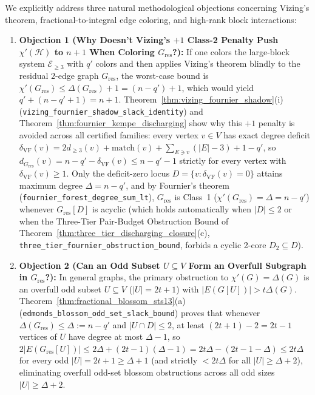 \documentclass[11pt,reqno]{amsart}
\theoremstyle{definition}
\theoremstyle{remark}
\begin{document}
We explicitly address three natural methodological objections concerning Vizing's theorem, fractional-to-integral edge coloring, and high-rank block interactions:
\begin{enumerate}
  \item \textbf{Objection 1 (Why Doesn't Vizing's $+1$ Class-2 Penalty Push $\chi'(\mathcal{H})$ to $n + 1$ When Coloring $G_{\mathrm{res}}$?):} If one colors the large-block system $\mathcal{E}_{\ge 3}$ with $q'$ colors and then applies Vizing's theorem blindly to the residual $2$-edge graph $G_{\mathrm{res}}$, the worst-case bound is $\chi'(G_{\mathrm{res}}) \le \Delta(G_{\mathrm{res}}) + 1 = (n - q') + 1$, which would yield $q' + (n - q' + 1) = n + 1$. Theorem~\ref{thm:vizing_fournier_shadow}(i) (\texttt{vizing\_fournier\_shadow\_slack\_identity}) and Theorem~\ref{thm:fournier_kempe_discharging} show why this $+1$ penalty is avoided across all certified families: every vertex $v \in V$ has exact degree deficit $\delta_{\mathrm{VF}}(v) = 2 d_{\ge 3}(v) + \mathrm{match}(v) + \sum_{E \ni v}(|E| - 3) + 1 - q'$, so $d_{G_{\mathrm{res}}}(v) = n - q' - \delta_{\mathrm{VF}}(v) \le n - q' - 1$ strictly for every vertex with $\delta_{\mathrm{VF}}(v) \ge 1$. Only the deficit-zero locus $D = \{v : \delta_{\mathrm{VF}}(v) = 0\}$ attains maximum degree $\Delta = n - q'$, and by Fournier's theorem (\texttt{fournier\_forest\_degree\_sum\_lt}), $G_{\mathrm{res}}$ is Class~1 ($\chi'(G_{\mathrm{res}}) = \Delta = n - q'$) whenever $G_{\mathrm{res}}[D]$ is acyclic (which holds automatically when $|D| \le 2$ or when the Three-Tier Pair-Budget Obstruction Bound of Theorem~\ref{thm:three_tier_discharging_closure}(c), \texttt{three\_tier\_fournier\_obstruction\_bound}, forbids a cyclic 2-core $D_2 \subseteq D$).
  \item \textbf{Objection 2 (Can an Odd Subset $U \subseteq V$ Form an Overfull Subgraph in $G_{\mathrm{res}}$?):} In general graphs, the primary obstruction to $\chi'(G) = \Delta(G)$ is an overfull odd subset $U \subseteq V$ ($|U| = 2t + 1$) with $|E(G[U])| > t\Delta(G)$. Theorem~\ref{thm:fractional_blossom_sts13}(a) (\texttt{edmonds\_blossom\_odd\_set\_slack\_bound}) proves that whenever $\Delta(G_{\mathrm{res}}) \le \Delta := n - q'$ and $|U \cap D| \le 2$, at least $(2t + 1) - 2 = 2t - 1$ vertices of $U$ have degree at most $\Delta - 1$, so $2|E(G_{\mathrm{res}}[U])| \le 2\Delta + (2t - 1)(\Delta - 1) = 2t\Delta - (2t - 1 - \Delta) \le 2t\Delta$ for every odd $|U| = 2t + 1 \ge \Delta + 1$ (and strictly $< 2t\Delta$ for all $|U| \ge \Delta + 2$), eliminating overfull odd-set blossom obstructions across all odd sizes $|U| \ge \Delta + 2$.

\end{enumerate}
\end{document}
